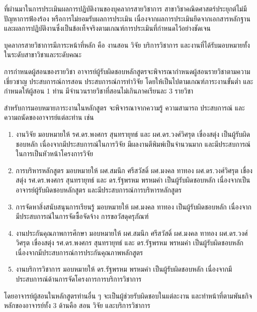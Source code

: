 ที่ผ่านมาในการประเมินผลการปฏิบัติงานของบุคลากรสายวิชาการ สาขาวิชาคณิตศาสตร์ประยุกต์ไม่มีปัญหาการฟ้องร้อง หรือการไม่ยอมรับผลการประเมิน เนื่องจากผลการประเมินยึดจากเอกสารหลักฐาน และผลการปฏิบัติงานซึ่งเป็นข้อเท็จจริงตามเกณฑ์การประเมินที่กำหนดไว้อย่างชัดเจน

\begin{doclist}
\end{doclist}


บุคลากรสายวิชาการมีภาระหน้าที่หลัก คือ งานสอน วิจัย บริการวิชาการ และงานที่ได้รับมอบหมายทั้งในระดับสาขาวิชาและระดับคณะ 

การกำหนดผู้สอนของรายวิชา อาจารย์ผู้รับผิดชอบหลักสูตรจะพิจารณากำหนดผู้สอนรายวิชาตามความเชี่ยวชาญ ประสบการณ์การสอน ประสบการณ์การทำวิจัย โดยให้เป็นไปตามเกณฑ์ภาระงานขั้นต่ำ และกำหนดให้ผู้สอน 1 ท่าน มีจำนวนรายวิชาที่สอนไม่เกินภาคเรียนละ 3 รายวิชา

สำหรับการมอบหมายภาระงานในหลักสูตร จะพิจารณาจากความรู้ ความสามารถ ประสบการณ์ และความถนัดของอาจารย์แต่ละท่าน เช่น 
\begin{enumerate}
\item งานวิจัย มอบหมายให้ รศ.ดร.พงศกร สุนทรายุทธ์ และ ผศ.ดร.วงศ์วิศรุต เขื่องสตุ่ง เป็นผู้รับผิดชอบหลัก เนื่องจากมีประสบการณ์ในการวิจัย มีผลงานตีพิมพ์เป็นจำนวนมาก และมีประสบการณ์ในการเป็นหัวหน้าโครงการวิจัย
\item การบริหารหลักสูตร มอบหมายให้ ผศ.สมนึก ศรีสวัสดิ์ ผศ.มงคล ทาทอง ผศ.ดร.วงศ์วิศรุต เขื่องสตุ่ง รศ.ดร.พงศกร สุนทรายุทธ์ และ ดร.รัฐพรหม พรหมคำ เป็นผู้รับผิดชอบหลัก เนื่องจากเป็นอาจารย์ผู้รับผิดชอบหลักสูตร และมีประสบการณ์การบริหารหลักสูตร
\item การจัดหาสิ่งสนับสนุนการเรียนรู้ มอบหมายให้ ผศ.มงคล ทาทอง เป็นผู้รับผิดชอบหลัก เนื่องจากมีประสบการณ์ในการจัดซื้อจัดจ้าง การขอวัสดุครุภัณฑ์  
\item งานประกันคุณภาพการศึกษา มอบหมายให้ ผศ.สมนึก ศรีสวัสดิ์ ผศ.มงคล ทาทอง ผศ.ดร.วงศ์วิศรุต เขื่องสตุ่ง รศ.ดร.พงศกร สุนทรายุทธ์ และ ดร.รัฐพรหม พรหมคำ เป็นผู้รับผิดชอบหลัก เนื่องจากมีประสบการณ์การประกันคุณภาพหลักสูตร
\item งานบริการวิชาการ มอบหมายให้ ดร.รัฐพรหม พรหมคำ เป็นผู้รับผิดชอบหลัก เนื่องจากมีประสบการณ์ด้านการจัดโครงการการบริการวิชาการ
\end{enumerate}

โดยอาจารย์ผู้สอนในหลักสูตรท่านอื่น ๆ จะเป็นผู้ช่วยรับผิดชอบในแต่ละงาน และทำหน้าที่ตามพันธกิจหลักของอาจารย์ทั้ง 3 ด้านคือ สอน วิจัย และบริการวิชาการ

